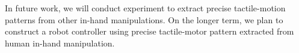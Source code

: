 \documentclass[letterpaper, 10 pt, conference]{IEEEtran}  %
\begin{document}
In future work, we will conduct experiment to extract precise tactile-motion patterns from other in-hand manipulations. On the longer term, we plan to construct a robot controller using precise tactile-motor pattern extracted from human in-hand manipulation.
\addtolength{\textheight}{-12cm}   %








%

\end{document}
